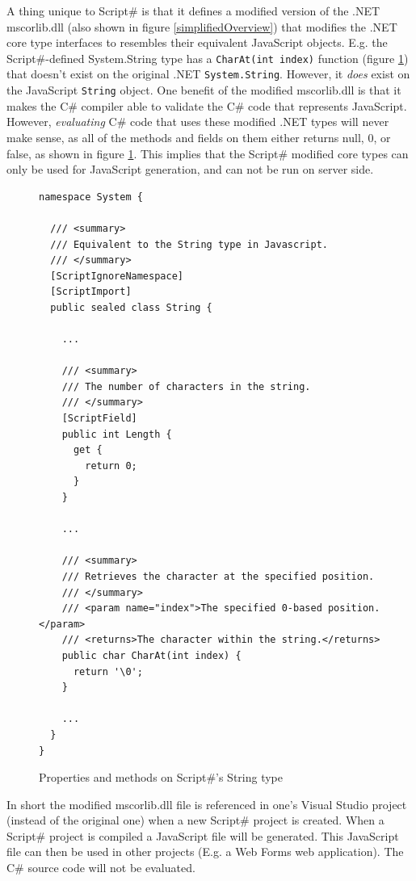 		A thing unique to Script\# is that it defines a modified version of the .NET mscorlib.dll (also shown in figure \ref{simplifiedOverview}) that modifies the .NET core type interfaces to resembles their equivalent JavaScript objects. E.g. the Script\#-defined System.String type has a \texttt{CharAt(int index)} function (figure \ref{fig:scriptsharp_net_types}) that doesn't exist on the original .NET \texttt{System.String}. However, it \emph{does} exist on the JavaScript \texttt{String} object. One benefit of the modified mscorlib.dll is that it makes the C\# compiler able to validate the C\# code that represents JavaScript. However, \emph{evaluating} C\# code that uses these modified .NET types will never make sense, as all of the methods and fields on them either returns null, 0, or false, as shown in figure \ref{fig:scriptsharp_net_types}. This implies that the Script\# modified core types can only be used for JavaScript generation, and can not be run on server side.

		\begin{figure}
			\begin{lstlisting}[language=CSharp,classoffset=1,morekeywords={String}]
namespace System {

  /// <summary>
  /// Equivalent to the String type in Javascript.
  /// </summary>
  [ScriptIgnoreNamespace]
  [ScriptImport]
  public sealed class String {

    ...

    /// <summary>
    /// The number of characters in the string.
    /// </summary>
    [ScriptField]
    public int Length {
      get {
        return 0;
      }
    }

    ...

    /// <summary>
    /// Retrieves the character at the specified position.
    /// </summary>
    /// <param name="index">The specified 0-based position.</param>
    /// <returns>The character within the string.</returns>
    public char CharAt(int index) {
      return '\0';
    }

    ...
  }
}

			\end{lstlisting}
			\caption{Properties and methods on Script\#'s String type}
			\label{fig:scriptsharp_net_types}
		\end{figure}

		In short the modified mscorlib.dll file is referenced in one's Visual Studio project (instead of the original one) when a new Script\# project is created. When a Script\# project is compiled a JavaScript file will be generated. This JavaScript file can then be used in other projects (E.g. a Web Forms web application). The C\# source code will not be evaluated.


